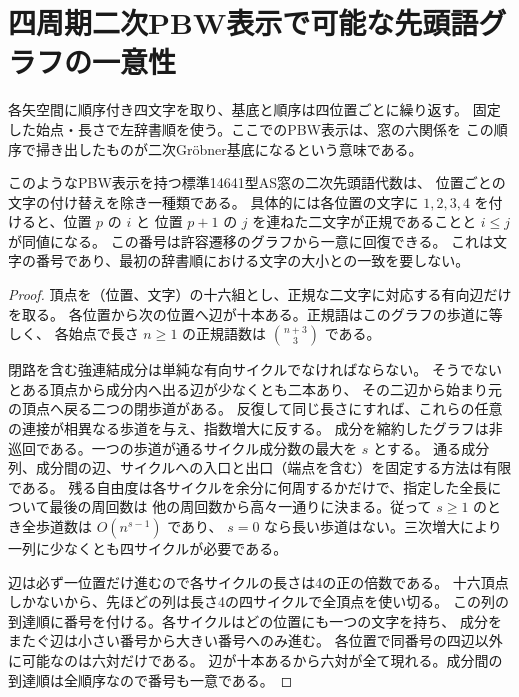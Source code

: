 \section{四周期二次PBW表示で可能な先頭語グラフの一意性}
\label{sec:periodic-pbw-graph}
各矢空間に順序付き四文字を取り、基底と順序は四位置ごとに繰り返す。
固定した始点・長さで左辞書順を使う。ここでのPBW表示は、窓の六関係を
この順序で掃き出したものが二次Gröbner基底になるという意味である。
\begin{theorem}\label{thm:periodic-pbw-graph}
このようなPBW表示を持つ標準14641型AS窓の二次先頭語代数は、
位置ごとの文字の付け替えを除き一種類である。
具体的には各位置の文字に $1,2,3,4$ を付けると、位置 $p$ の $i$ と
位置 $p+1$ の $j$ を連ねた二文字が正規であることと $i\le j$ が同値になる。
この番号は許容遷移のグラフから一意に回復できる。
これは文字の番号であり、最初の辞書順における文字の大小との一致を要しない。
\end{theorem}
\begin{proof}
頂点を（位置、文字）の十六組とし、正規な二文字に対応する有向辺だけを取る。
各位置から次の位置へ辺が十本ある。正規語はこのグラフの歩道に等しく、
各始点で長さ $n\ge1$ の正規語数は $\binom{n+3}{3}$ である。

閉路を含む強連結成分は単純な有向サイクルでなければならない。
そうでないとある頂点から成分内へ出る辺が少なくとも二本あり、
その二辺から始まり元の頂点へ戻る二つの閉歩道がある。
反復して同じ長さにすれば、これらの任意の連接が相異なる歩道を与え、指数増大に反する。
成分を縮約したグラフは非巡回である。一つの歩道が通るサイクル成分数の最大を $s$ とする。
通る成分列、成分間の辺、サイクルへの入口と出口（端点を含む）を固定する方法は有限である。
残る自由度は各サイクルを余分に何周するかだけで、指定した全長について最後の周回数は
他の周回数から高々一通りに決まる。従って $s\ge1$ のとき全歩道数は $O(n^{s-1})$ であり、
$s=0$ なら長い歩道はない。三次増大により一列に少なくとも四サイクルが必要である。

辺は必ず一位置だけ進むので各サイクルの長さは4の正の倍数である。
十六頂点しかないから、先ほどの列は長さ4の四サイクルで全頂点を使い切る。
この列の到達順に番号を付ける。各サイクルはどの位置にも一つの文字を持ち、
成分をまたぐ辺は小さい番号から大きい番号へのみ進む。
各位置で同番号の四辺以外に可能なのは六対だけである。
辺が十本あるから六対が全て現れる。成分間の到達順は全順序なので番号も一意である。
\end{proof}

